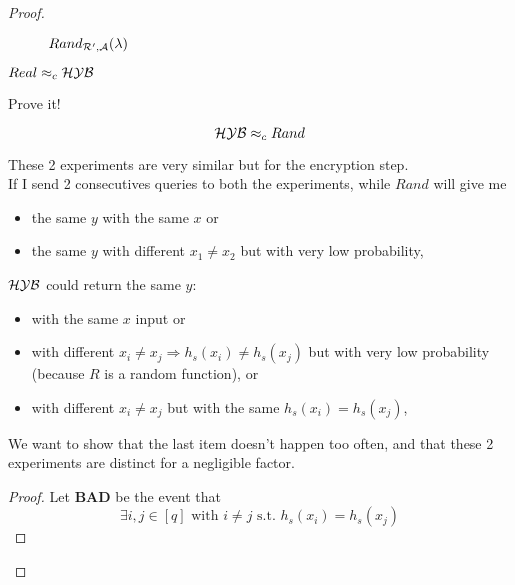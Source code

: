 \begin{proof}
\begin{figure}[h!]
   \caption{$Rand_{\mathcal{R}', \mathcal{A}}(\lambda)$}
\end{figure}

\begin{lemma}
    
    $Real \approx_{c} \mathcal{H}\mathcal{Y}\mathcal{B}$

\end{lemma}
\begin{exercise}
    Prove it!
\end{exercise}

\begin{lemma}
    \[
       \mathcal{H}\mathcal{Y}\mathcal{B} \approx_{c} Rand 
    \]
\end{lemma}
These 2 experiments are very similar but for the encryption step.\\
If I send 2 consecutives queries to both the experiments, while $Rand$ will
give me 
\begin{itemize}
    \item the same $y$ with the same $x$ or 
    \item the same $y$ with different $x_{1}\not=x_{2}$ but with very low probability, 
\end{itemize}
$\mathcal{H}\mathcal{Y}\mathcal{B}$ could return the same $y$:
\begin{itemize}
    \item with the same $x$ input or
    \item with different $x_{i}\not=x_{j} \Rightarrow h_{s}(x_{i}) 
        \not= h_{s}(x_{j})$ but with very low
        probability (because $R$ is a random function), or
    \item with different $x_{i}\not= x_{j}$ but with the same
        $h_{s}(x_{i})=h_{s}(x_{j})$,
\end{itemize}

We want to show that the last item doesn't happen too often, and that these 2
experiments are distinct for a negligible factor.

\begin{proof}
    Let \textbf{BAD}  be the event that
    \begin{equation*}
        \exists i, j \in [q] \text{ with } i\not= j \text{ s.t. } h_{s}(x_{i})=h_{s}(x_{j})
    \end{equation*}


\end{proof}
\end{proof}
